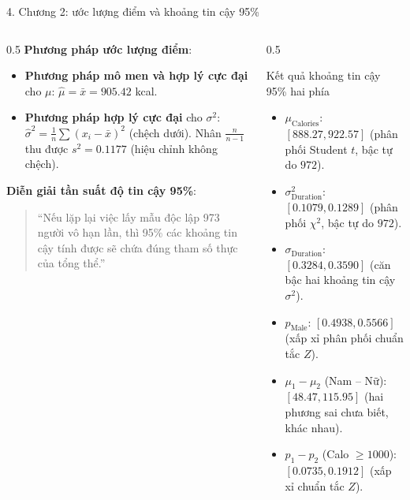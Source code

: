 \documentclass[aspectratio=169, 10pt]{beamer}
\begin{document}
\begin{frame}{4. Chương 2: ước lượng điểm và khoảng tin cậy 95\%}
    \begin{columns}
        \begin{column}{0.5\textwidth}
            \textbf{Phương pháp ước lượng điểm}:
            \begin{itemize}
                \item \textbf{Phương pháp mô men và hợp lý cực đại} cho $\mu$: $\hat{\mu} = \bar{x} = 905.42$ kcal.
                \item \textbf{Phương pháp hợp lý cực đại} cho $\sigma^2$: $\hat{\sigma}^2 = \frac{1}{n}\sum (x_i - \bar{x})^2$ (chệch dưới). Nhân $\frac{n}{n-1}$ thu được $s^2 = 0.1177$ (hiệu chỉnh không chệch).
            \end{itemize}
            \vspace{5pt}
            \textbf{Diễn giải tần suất độ tin cậy 95\%}:
            \begin{quote}
                \small ``Nếu lặp lại việc lấy mẫu độc lập 973 người vô hạn lần, thì 95\% các khoảng tin cậy tính được sẽ chứa đúng tham số thực của tổng thể.''
            \end{quote}
        \end{column}
        \begin{column}{0.5\textwidth}
            \begin{block}{Kết quả khoảng tin cậy 95\% hai phía}
                \footnotesize
                \begin{itemize}
                    \item $\mu_{\text{Calories}}$: $[888.27, 922.57]$ (phân phối Student $t$, bậc tự do $972$).
                    \item $\sigma^2_{\text{Duration}}$: $[0.1079, 0.1289]$ (phân phối $\chi^2$, bậc tự do $972$).
                    \item $\sigma_{\text{Duration}}$: $[0.3284, 0.3590]$ (căn bậc hai khoảng tin cậy $\sigma^2$).
                    \item $p_{\text{Male}}$: $[0.4938, 0.5566]$ (xấp xỉ phân phối chuẩn tắc $Z$).
                    \item $\mu_1 - \mu_2$ (Nam -- Nữ): $[48.47, 115.95]$ (hai phương sai chưa biết, khác nhau).
                    \item $p_1 - p_2$ (Calo $\ge 1000$): $[0.0735, 0.1912]$ (xấp xỉ chuẩn tắc $Z$).
                \end{itemize}
            \end{block}
        \end{column}
    \end{columns}
\end{frame}
\end{document}
